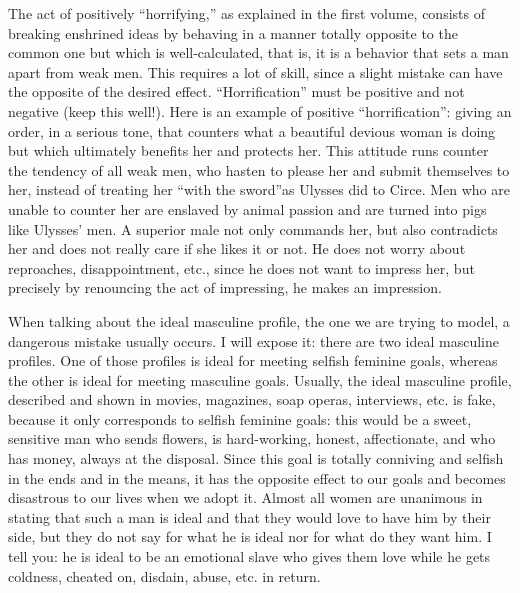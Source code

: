 \par The act of positively \enquote{horrifying,} as explained in the first volume, consists of breaking enshrined ideas by behaving in a manner totally opposite to the common one but which is well-calculated, that is, it is a behavior that sets a man apart from weak men. This requires a lot of skill, since a slight mistake can have the opposite of the desired effect. \enquote{Horrification} must be positive and not negative (keep this well!). Here is an example of positive \enquote{horrification}: giving an order, in a serious tone, that counters what a beautiful devious woman is doing but which ultimately benefits her and protects her. This attitude runs counter the tendency of all weak men, who hasten to please her and submit themselves to her, instead of treating her \enquote{with the sword}\footnotemark[40] as Ulysses did to Circe. Men who are unable to counter her are enslaved by animal passion and are turned into pigs like Ulysses' men. A superior male not only commands her, but also contradicts her and does not really care if she likes it or not. He does not worry about reproaches, disappointment, etc., since he does not want to impress her, but precisely by renouncing the act of impressing, he makes an impression.


\par When talking about the ideal masculine profile, the one we are trying to model, a dangerous mistake usually occurs. I will expose it: there are two ideal masculine profiles. One of those profiles is ideal for meeting selfish feminine goals, whereas the other is ideal for meeting masculine goals. Usually, the ideal masculine profile, described and shown in movies, magazines, soap operas, interviews, etc. is fake, because it only corresponds to selfish feminine goals: this would be a sweet, sensitive man who sends flowers, is hard-working, honest, affectionate, and who has money, always at the disposal. Since this goal is totally conniving and selfish in the ends and in the means, it has the opposite effect to our goals and becomes disastrous to our lives when we adopt it. Almost all women are unanimous in stating that such a man is ideal and that they would love to have him by their side, but they do not say for what he is ideal nor for what do they want him. I tell you: he is ideal to be an emotional slave who gives them love while he gets coldness, cheated on, disdain, abuse, etc. in return.

